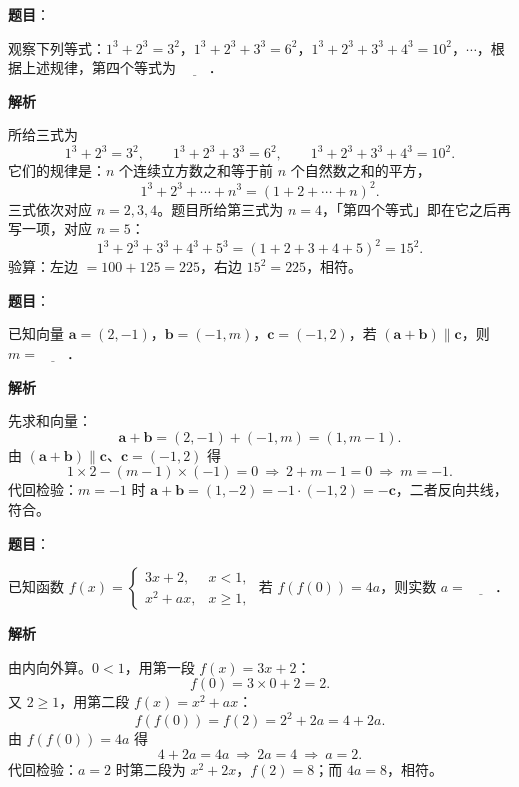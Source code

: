 \begin{answer}

\textbf{题目}：

观察下列等式：$1^3+2^3=3^2$，$1^3+2^3+3^3=6^2$，$1^3+2^3+3^3+4^3=10^2$，$\cdots$，根据上述规律，第四个等式为 $\underline{\qquad}$．

\textbf{解析}

所给三式为
\nopagebreak[4]
\[1^3+2^3=3^2,\qquad 1^3+2^3+3^3=6^2,\qquad 1^3+2^3+3^3+4^3=10^2.\]
它们的规律是：$n$ 个连续立方数之和等于前 $n$ 个自然数之和的平方，
\nopagebreak[4]
\[1^3+2^3+\cdots+n^3=(1+2+\cdots+n)^2.\]
三式依次对应 $n=2,3,4$。题目所给第三式为 $n=4$，「第四个等式」即在它之后再写一项，对应 $n=5$：
\nopagebreak[4]
\[1^3+2^3+3^3+4^3+5^3=(1+2+3+4+5)^2=15^2.\]
验算：左边 $=100+125=225$，右边 $15^2=225$，相符。


\end{answer}
\begin{answer}

\textbf{题目}：

已知向量 $\boldsymbol a=(2,-1)$，$\boldsymbol b=(-1,m)$，$\boldsymbol c=(-1,2)$，若 $(\boldsymbol a+\boldsymbol b)\parallel\boldsymbol c$，则 $m=\underline{\qquad}$．

\textbf{解析}

先求和向量：
\nopagebreak[4]
\[\boldsymbol a+\boldsymbol b=(2,-1)+(-1,m)=(1,m-1).\]
由 $(\boldsymbol a+\boldsymbol b)\parallel\boldsymbol c$、$\boldsymbol c=(-1,2)$ 得
\nopagebreak[4]
\[1\times 2-(m-1)\times(-1)=0\ \Longrightarrow\ 2+m-1=0\ \Longrightarrow\ m=-1.\]
代回检验：$m=-1$ 时 $\boldsymbol a+\boldsymbol b=(1,-2)=-1\cdot(-1,2)=-\boldsymbol c$，二者反向共线，符合。


\end{answer}
\begin{answer}

\textbf{题目}：

已知函数 $f(x)=\begin{cases}3x+2,&x<1,\\[2pt]x^2+ax,&x\geqslant 1,\end{cases}$ 若 $f(f(0))=4a$，则实数 $a=\underline{\qquad}$．

\textbf{解析}

由内向外算。$0<1$，用第一段 $f(x)=3x+2$：
\nopagebreak[4]
\[f(0)=3\times 0+2=2.\]
又 $2\geqslant 1$，用第二段 $f(x)=x^2+ax$：
\nopagebreak[4]
\[f(f(0))=f(2)=2^2+2a=4+2a.\]
由 $f(f(0))=4a$ 得
\nopagebreak[4]
\[4+2a=4a\ \Longrightarrow\ 2a=4\ \Longrightarrow\ a=2.\]
代回检验：$a=2$ 时第二段为 $x^2+2x$，$f(2)=8$；而 $4a=8$，相符。


\end{answer}
